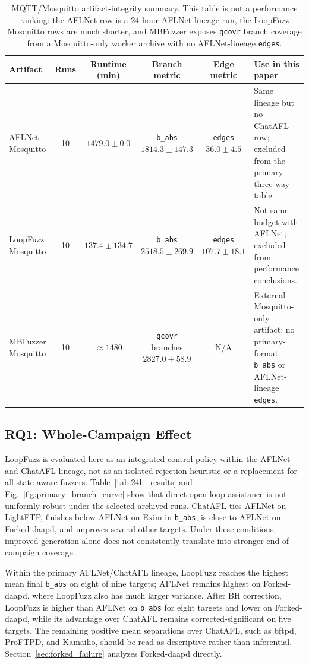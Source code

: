 \documentclass[final,5p,times,number]{elsarticle}
\begin{document}
\begin{table}[!t]
\centering
\caption{MQTT/Mosquitto artifact-integrity summary. This table is not a performance ranking: the AFLNet row is a 24-hour AFLNet-lineage run, the LoopFuzz Mosquitto rows are much shorter, and MBFuzzer exposes \texttt{gcovr} branch coverage from a Mosquitto-only worker archive with no AFLNet-lineage \texttt{edges}.}
\label{tab:mqtt_artifact_integrity}
{\scriptsize
\setlength{\tabcolsep}{4.0pt}
\renewcommand{\arraystretch}{1.0}
\begin{tabularx}{\textwidth}{l c c c c X}
\toprule
Artifact & Runs & Runtime (min) & Branch metric & Edge metric & Use in this paper \\
\midrule
AFLNet Mosquitto & 10 & $1479.0 {\pm} 0.0$ & \texttt{b\_abs} $1814.3 {\pm} 147.3$ & \texttt{edges} $36.0 {\pm} 4.5$ & Same lineage but no ChatAFL row; excluded from the primary three-way table. \\
LoopFuzz Mosquitto & 10 & $137.4 {\pm} 134.7$ & \texttt{b\_abs} $2518.5 {\pm} 269.9$ & \texttt{edges} $107.7 {\pm} 18.1$ & Not same-budget with AFLNet; excluded from performance conclusions. \\
MBFuzzer Mosquitto & 10 & $\approx 1480$ & \texttt{gcovr} branches $2827.0 {\pm} 58.9$ & N/A & External Mosquitto-only artifact; no primary-format \texttt{b\_abs} or AFLNet-lineage \texttt{edges}. \\
\bottomrule
\end{tabularx}
}
\end{table}

\subsection{RQ1: Whole-Campaign Effect}
LoopFuzz is evaluated here as an integrated control policy within the AFLNet and ChatAFL lineage, not as an isolated rejection heuristic or a replacement for all state-aware fuzzers. Table~\ref{tab:24h_results} and Fig.~\ref{fig:primary_branch_curve} show that direct open-loop assistance is not uniformly robust under the selected archived runs. ChatAFL ties AFLNet on LightFTP, finishes below AFLNet on Exim in \texttt{b\_abs}, is close to AFLNet on Forked-daapd, and improves several other targets. Under these conditions, improved generation alone does not consistently translate into stronger end-of-campaign coverage.

Within the primary AFLNet/ChatAFL lineage, LoopFuzz reaches the highest mean final \texttt{b\_abs} on eight of nine targets; AFLNet remains highest on Forked-daapd, where LoopFuzz also has much larger variance. After BH correction, LoopFuzz is higher than AFLNet on \texttt{b\_abs} for eight targets and lower on Forked-daapd, while its advantage over ChatAFL remains corrected-significant on five targets. The remaining positive mean separations over ChatAFL, such as bftpd, ProFTPD, and Kamailio, should be read as descriptive rather than inferential. Section~\ref{sec:forked_failure} analyzes Forked-daapd directly.
\end{document}
